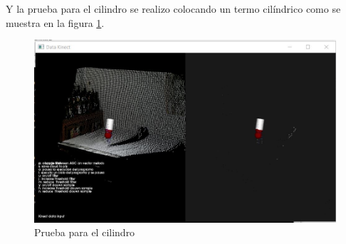 Y la prueba para el \gls{cilindro} se realizo colocando un  termo cilíndrico como se muestra en la figura \ref{fig:pruebaCyl}.


\begin{figure}[!htb] 
	\centering
	\includegraphics[width=1\textwidth]{03Resultados/imagenes/cilindro.JPG}
	\caption{Prueba para el cilindro} 
	\label{fig:pruebaCyl}
\end{figure}















	 
	 
	 
	 
	 
	 
